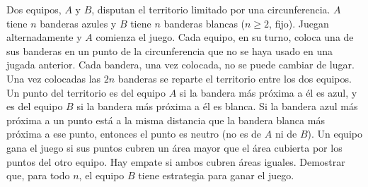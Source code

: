Dos equipos, $A$ y $B$, disputan el territorio limitado por una circunferencia. $A$ tiene $n$ banderas azules y $B$ tiene $n$ banderas blancas ($n \geq 2$, fijo). Juegan alternadamente y $A$ comienza el juego. Cada equipo, en su turno, coloca una de sus banderas en un punto de la circunferencia que no se haya usado en una jugada anterior. Cada bandera, una vez colocada, no se puede cambiar de lugar. Una vez colocadas las $2n$ banderas se reparte el territorio entre los dos equipos. Un punto del territorio es del equipo $A$ si la bandera más próxima a él es azul, y es del equipo $B$ si la bandera más próxima a él es blanca. Si la bandera azul más próxima a un punto está a la misma distancia que la bandera blanca más próxima a ese punto, entonces el punto es neutro (no es de $A$ ni de $B$). Un equipo gana el juego si sus puntos cubren un área mayor que el área cubierta por los puntos del otro equipo. Hay empate si ambos cubren áreas iguales. Demostrar que, para todo $n$, el equipo $B$ tiene estrategia para ganar el juego.

